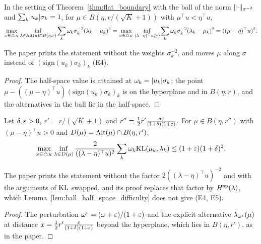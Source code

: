\begin{lemma}[{\cite[Lemma 17]{D23}}]
  \label{lem:ball_half_space_difficulty}
  In the setting of Theorem~\ref{thm:flat_boundary} with the ball of the norm
  $\lVert \cdot \rVert_{\sigma^{-2}}$ and $\sum_k \lvert u_k \rvert \sigma_k = 1$, for $\mu \in B(\eta, r / (\sqrt K
  + 1))$ with $\mu^{\top} u < \eta^{\top} u$,
  \[ \max_{\omega \in \triangle_K} \inf_{\lambda \in \mathrm{Alt}(\mu) \cap B(\eta, r)} \sum_k \omega_k
    \sigma_k^{-2} (\lambda_k - \mu_k)^2 = \max_{\omega \in \triangle_K} \inf_{(\lambda - \eta)^{\top} u
    \ge 0} \sum_k \omega_k \sigma_k^{-2} (\lambda_k - \mu_k)^2 = ((\mu - \eta)^{\top} u)^2. \]
\end{lemma}

The paper prints the statement without the weights $\sigma_k^{-2}$, and moves $\mu$ along $\sigma$
instead of $(\mathrm{sign}(u_k) \sigma_k)_k$ (E4).

\begin{proof}
  The half-space value is attained at $\omega_k = \lvert u_k \rvert \sigma_k$; the point $\mu - ((\mu -
  \eta)^{\top} u) (\mathrm{sign}(u_k) \sigma_k)_k$ is on the hyperplane and in $B(\eta, r)$, and the
  alternatives in the ball lie in the half-space.
\end{proof}

\begin{lemma}[{\cite[Lemma 18]{D23}}]
  \label{lem:ball_bound}
  Let $\delta, \varepsilon > 0$, $r' = r / (\sqrt K + 1)$ and $r'' = \frac12 r' \frac{\delta\varepsilon}{(1 +
  \delta)(1 + \varepsilon)}$. For $\mu \in B(\eta, r'')$ with $(\mu - \eta)^{\top} u > 0$ and
  $D(\mu) = \mathrm{Alt}(\mu) \cap B(\eta, r')$,
  \[ \max_{\omega \in \triangle_K} \inf_{\lambda \in D(\mu)} \frac{2}{((\lambda - \eta)^{\top} u)^2}
    \sum_k \omega_k \mathrm{KL}(\mu_k, \lambda_k) \le (1 + \varepsilon)(1 + \delta)^2. \]
\end{lemma}

The paper prints the statement without the factor $2((\lambda - \eta)^{\top} u)^{-2}$ and with the
arguments of $\mathrm{KL}$ swapped, and its proof replaces that factor by $H^{\mathrm{sp}}(\lambda)$, which
Lemma~\ref{lem:ball_half_space_difficulty} does not give (E4, E5).

\begin{proof}
  The perturbation $\omega^{\varepsilon} = (\omega + \varepsilon) / (1 + \varepsilon)$ and the explicit alternative
  $\lambda_{\omega^{\varepsilon}}(\mu)$ at distance $x = \frac12 r' \frac{\varepsilon}{(1 + \delta)(1 + \varepsilon)}$
  beyond the hyperplane, which lies in $B(\eta, r')$, as in the paper.
\end{proof}

